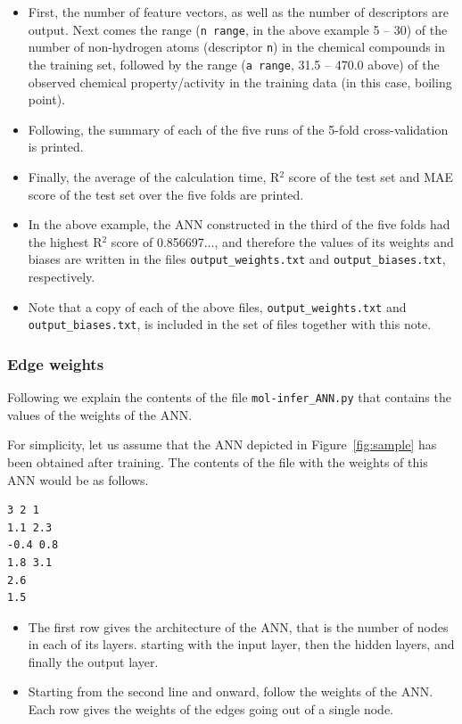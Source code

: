 \documentclass[11pt,titlepage,dvipdfmx,twoside]{book}
\newcommand{\figref}[1]{Figure~\ref{fig:#1}}
\begin{document}
\begin{itemize}
\item  
First, the number of feature vectors, as well as the
number of descriptors are output.
Next comes the range 
(\verb|n range|, in the above example 5 -- 30)
of the number of non-hydrogen atoms (descriptor \verb|n|)
in the chemical
compounds in the training set, 
followed by the range 
(\verb|a range|,  31.5 -- 470.0 above)
of the observed 
chemical property/activity in the training data
(in this case, boiling point).

\item 
Following, the summary of each of the five runs of the
5-fold cross-validation is printed.

\item
Finally, the average of the calculation time,
R$^2$ score of the test set and MAE score of the test set over the 
five folds are printed.

\item 
In the above example, the ANN constructed 
in the third of the five folds had the 
highest R$^2$ score of 0.856697$\dots$, 
and therefore the values of its weights and
biases are written in the files
\verb|output_weights.txt| and \verb|output_biases.txt|, respectively.

\item
Note that a copy of each of the above files, 
\verb|output_weights.txt| and \verb|output_biases.txt|, 
is included in the set of files together with this note.
\end{itemize}


\subsubsection{Edge weights}
Following we explain the contents of the file
\verb|mol-infer_ANN.py|
that contains the values of the weights of the ANN.


For simplicity, let us assume that the ANN depicted
in \figref{sample} has been obtained after training.
The contents of the file with the weights of this ANN
would be as follows.
%
\begin{oframed}
{\small
\begin{verbatim}
3 2 1
1.1 2.3
-0.4 0.8
1.8 3.1
2.6
1.5
\end{verbatim}
}
\end{oframed}
%
\begin{itemize}
\item 
The first row gives the architecture of the ANN,
that is the number of nodes in each of its layers.
starting with the input layer, then the hidden layers, and
finally the output layer.

\item 
Starting from the second line and onward,
follow the weights of the ANN.
Each row gives the weights of the edges going out of a single node.
\end{itemize}
\end{document}
